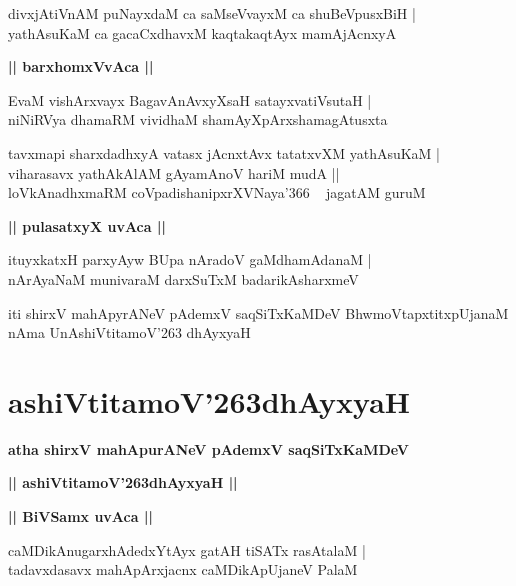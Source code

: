 \documentclass[twoside,12pt,openright]{book}
\def\S{\char'263}
\newcounter{shloka}[chapter]
\def\uvaca#1{\centerline{{\large\textbf{#1}}}}
\begin{document}
\begin{shloka}%
divxjAtiVnAM puNayxdaM ca saMseVvayxM ca shuBeVpusxBiH |\\
yathAsuKaM ca gacaCxdhavxM kaqtakaqtAyx mamAjAcnxyA 
\end{shloka}

\uvaca{|| barxhomxVvAca ||}

\begin{shloka}%
EvaM vishArxvayx BagavAnAvxyXsaH satayxvatiVsutaH |\\
niNiRVya dhamaRM vividhaM shamAyXpArxshamagAtusxta
\end{shloka}

\begin{shloka}%
tavxmapi sharxdadhxyA vatasx jAcnxtAvx tatatxvXM yathAsuKaM |\\
viharasavx yathAkAlAM gAyamAnoV hariM mudA ||\\
loVkAnadhxmaRM coVpadishanipxrXVNaya\char'366 ~ jagatAM guruM 
\end{shloka}

\uvaca{|| pulasatxyX uvAca ||}

\begin{shloka}%
ituyxkatxH parxyAyw BUpa nAradoV gaMdhamAdanaM |\\
nArAyaNaM munivaraM darxSuTxM badarikAsharxmeV 
\end{shloka}

\begin{center}
iti shirxV mahApyrANeV pAdemxV saqSiTxKaMDeV BhwmoVtapxtitxpUjanaM nAma UnAshiVtitamoV\S 
dhAyxyaH
\end{center}

\chapter{ashiVtitamoV\S dhAyxyaH}

\begin{center}
{\LARGE\bfseries atha shirxV mahApurANeV pAdemxV saqSiTxKaMDeV}
\end{center}

\begin{center}
{\LARGE\bfseries || ashiVtitamoV\S dhAyxyaH || }
\end{center}

\uvaca{|| BiVSamx uvAca ||}

\begin{shloka}%
caMDikAnugarxhAdedxYtAyx gatAH tiSATx rasAtalaM |\\
tadavxdasavx mahApArxjacnx caMDikApUjaneV PalaM 
\end{shloka}
\end{document}
